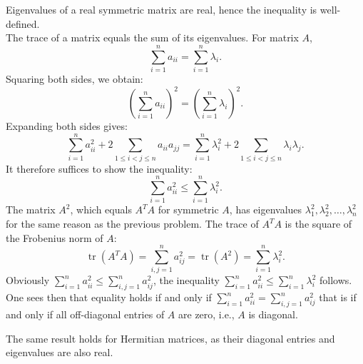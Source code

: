 \begin{solution}
    Eigenvalues of a real symmetric matrix are real, hence the inequality is well-defined. \\
    The trace of a matrix equals the sum of its eigenvalues. For matrix \( A \),
    \[
        \sum_{i=1}^{n} a_{ii} = \sum_{i=1}^{n} \lambda_{i}.
    \]
    Squaring both sides, we obtain:
    \[
        \left( \sum_{i=1}^{n} a_{ii} \right)^2 = \left( \sum_{i=1}^{n} \lambda_{i} \right)^2.
    \]
    Expanding both sides gives:
    \[
        \sum_{i=1}^{n} a_{ii}^2 + 2 \sum_{1 \leq i < j \leq n} a_{ii} a_{jj} = \sum_{i=1}^{n} \lambda_{i}^2 + 2 \sum_{1 \leq i < j \leq n} \lambda_{i} \lambda_{j}.
    \]
    It therefore suffices to show the inequality:
    \[
        \sum_{i=1}^{n} a_{ii}^2 \leq \sum_{i=1}^{n} \lambda_{i}^2.
    \]
    The matrix \( A^2 \), which equals \( A^T A \) for symmetric \( A \), has eigenvalues \( \lambda_{1}^2, \lambda_{2}^2, \ldots, \lambda_{n}^2 \) for the same reason as the previous problem. The trace of \( A^T A \) is the square of the Frobenius norm of \( A \):
    \[
        \operatorname{tr}\left(A^T A\right) = \sum_{i,j=1}^{n} a_{ij}^2 = \operatorname{tr}\left(A^2\right) = \sum_{i=1}^{n} \lambda_{i}^2.
    \]
    Obviously \( \sum_{i=1}^{n} a_{ii}^2 \leq \sum_{i,j=1}^{n} a_{ij}^2 \), the inequality \( \sum_{i=1}^{n} a_{ii}^2 \leq \sum_{i=1}^{n} \lambda_{i}^2 \) follows. One sees then that equality holds if and only if \( \sum_{i=1}^{n} a_{ii}^2 = \sum_{i,j=1}^{n} a_{ij}^2 \) that is if and only if all off-diagonal entries of \( A \) are zero, i.e., \( A \) is diagonal.
    \begin{remark}
        The same result holds for Hermitian matrices, as their diagonal entries and eigenvalues are also real.
    \end{remark}
\end{solution}
